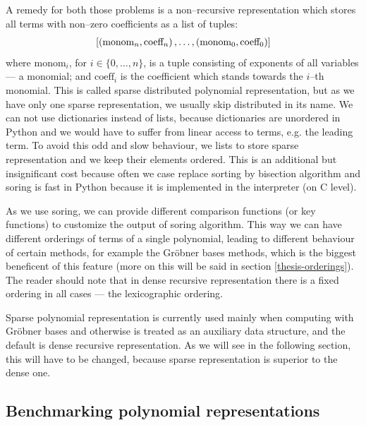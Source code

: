 A remedy for both those problems is a non--recursive representation which stores all terms
with non--zero coefficients as a list of tuples:
\begin{gather}
\begin{split}\left[\left(\mbox{monom}_n, \mbox{coeff}_n\right), \ldots, \left(\mbox{monom}_0, \mbox{coeff}_0\right)\right]\end{split}\notag
\end{gather}
where $\mbox{monom}_i$, for $i \in \{0, \ldots, n\}$, is a tuple consisting of exponents of
all variables --- a monomial; and $\mbox{coeff}_i$ is the coefficient which stands towards
the $i$--th monomial. This is called sparse distributed polynomial representation, but as
we have only one sparse representation, we usually skip distributed in its name.  We can
not use dictionaries instead of lists, because dictionaries are unordered in Python and
we would have to suffer from linear access to terms, e.g. the leading term.  To avoid this
odd and slow behaviour, we lists to store sparse representation and we keep their elements
ordered. This is an additional but insignificant cost because often we case replace sorting
by bisection algorithm and soring is fast in Python because it is implemented in the
interpreter (on C level).

As we use soring, we can provide different comparison functions (or key functions) to
customize the output of soring algorithm. This way we can have different orderings of
terms of a single polynomial, leading to different behaviour of certain methods, for
example the Gröbner bases methods, which is the biggest beneficent of this feature
(more on this will be said in section \ref{thesis-orderings}). The reader should note
that in dense recursive representation there is a fixed ordering in all cases --- the
lexicographic ordering.

Sparse polynomial representation is currently used mainly when computing with Gröbner
bases and otherwise is treated as an auxiliary data structure, and the default is dense
recursive representation. As we will see in the following section, this will have to be
changed, because sparse representation is superior to the dense one.


\subsection{Benchmarking polynomial representations}

